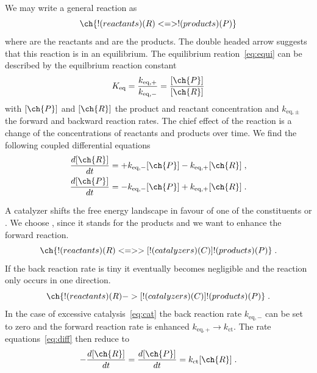 \documentclass[aip,jcp,reprint,a4paper,onecolumn,nofootinbib,amsmath,amssymb]{revtex4-1}
\begin{document}
We may write a general reaction as
\begin{equation}
  \label{eq:equi}
  \ch{!(reactants)(R) <=> !(products)(P)}
\end{equation}
where  are the reactants and  are the products.  The
double headed arrow suggests that this reaction is in an equilibrium.
The equilibrium reation~\eqref{eq:equi} can be described by the
equilbrium reaction constant
\begin{equation}
  \label{eq:const}
  K_{\text{eq}} = \frac{k_{\text{eq},+}}{k_{\text{eq},-}} = \frac{[\ch{P}]}{[\ch{R}]}
\end{equation}
with $[\ch{P}]$ and $[\ch{R}]$ the product and reactant concentration
and $k_{\textrm{eq},\pm}$ the forward and backward reaction rates.
The chief effect of the reaction is a change of the concentrations of
reactants and products over time.  We find the following coupled
differential equations
\begin{subequations}
  \label{eq:diff}
  \begin{align}
    \label{eq:diff-equi-a}
    \frac{d[\ch{R}]}{dt} &= + k_{\text{eq},-}[\ch{P}] - k_{\text{eq},+}[\ch{R}] \;, \\
    \label{eq:diff-equi-b}
    \frac{d[\ch{P}]}{dt} &= - k_{\text{eq},-}[\ch{P}] + k_{\text{eq},+}[\ch{R}]  \;.
  \end{align}
\end{subequations}

A catalyzer shifts the free energy landscape in favour of one of the
constituents  or .  We choose , since it stands for
the products and we want to enhance the forward reaction.
\begin{equation}
  \ch{!(reactants)(R) <=>>[ !(catalyzers)(C) ] !(products)(P)} \;.
\end{equation}
If the back reaction rate is tiny it eventually becomes negligible and
the reaction only occurs in one direction.
\begin{equation}
  \label{eq:cat}
  \ch{!(reactants)(R) ->[ !(catalyzers)(C) ] !(products)(P)} \;.
\end{equation}
In the case of excessive catalysis~\eqref{eq:cat} the back reaction
rate $k_{\text{eq},-}$ can be set to zero and the forward reaction
rate is enhanced $k_{\text{eq},+} \to k_{\text{ct}}$.  The rate
equations~\eqref{eq:diff} then reduce to
\begin{equation}
  \label{eq:diff-cat}
  -\frac{d[\ch{R}]}{dt} = \frac{d[\ch{P}]}{dt} = k_{\text{ct}}[\ch{R}] \;.
\end{equation}
\end{document}
